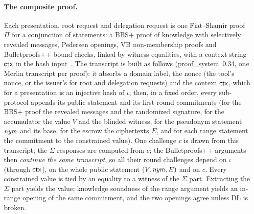 \paragraph{The composite proof.} Each presentation, root request and delegation request is one Fiat--Shamir proof $\Pi$ for a conjunction of statements: a BBS+ proof of knowledge with selectively revealed messages, Pedersen openings, VB non-membership proofs and Bulletproofs++ bound checks, linked by witness equalities, with a context string $\mathsf{ctx}$ in the hash input~\cite{dockcrypto}. The transcript is built as follows (proof\_system~0.34, one Merlin transcript per proof): it absorbs a domain label, the nonce (the tool's nonce, or the issuer's for root and delegation requests) and the context $\mathsf{ctx}$, which for a presentation is an injective hash of $\iota$; then, in a fixed order, every sub-protocol appends its public statement and its first-round commitments (for the BBS+ proof the revealed messages and the randomized signature, for the accumulator the value $V$ and the blinded witness, for the pseudonym statement $\mathit{nym}$ and its base, for the escrow the ciphertexts $E$, and for each range statement the commitment to the constrained value). One challenge $c$ is drawn from this transcript; the $\Sigma$ responses are computed from $c$; the Bulletproofs++ arguments then \emph{continue the same transcript}, so all their round challenges depend on $\iota$ (through $\mathsf{ctx}$), on the whole public statement $(V,\mathit{nym},E)$ and on $c$. Every constrained value is tied by an equality to a witness of the $\Sigma$ part. Extracting the $\Sigma$ part yields the value; knowledge soundness of the range argument yields an in-range opening of the same commitment, and the two openings agree unless DL is broken.

